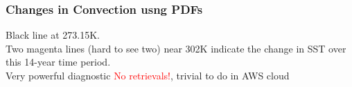 \documentclass[10pt,t]{beamer}
\begin{document}
\begin{frame}
  \frametitle{Changes in Convection usng PDFs}

  \vspace{-0.4in}

  \begin{figure}
  \hspace*{0.2in}
\end{figure}

Black line at 273.15K.\\
\vspace{0.1in}Two magenta lines (hard to see two) near 302K indicate the
change in SST over this 14-year time period.\\
\vspace{0.1in} Very powerful diagnostic \textcolor{red}{No retrievals!}, trivial to do in AWS cloud

\end{frame}
\end{document}
